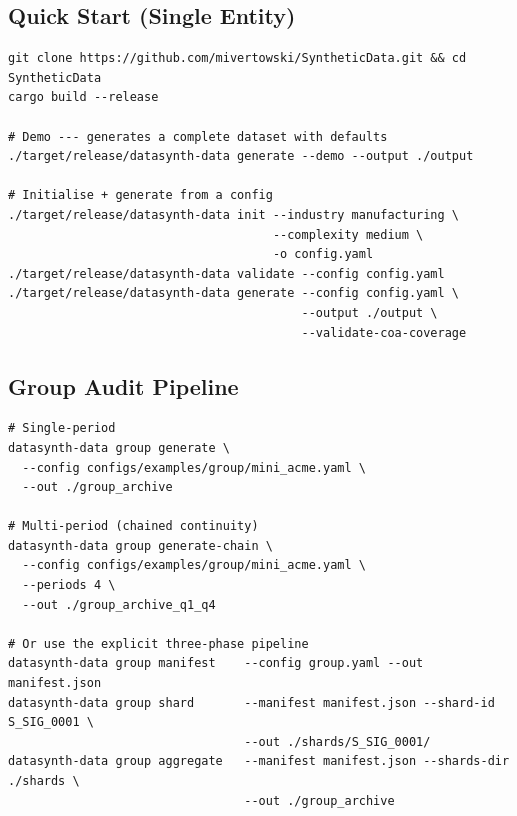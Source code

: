 \documentclass[11pt,a4paper]{article}
\begin{document}
\subsection{Quick Start (Single Entity)}

\begin{tcolorbox}[notebox={CLI}]
\small
\begin{verbatim}
git clone https://github.com/mivertowski/SyntheticData.git && cd SyntheticData
cargo build --release

# Demo --- generates a complete dataset with defaults
./target/release/datasynth-data generate --demo --output ./output

# Initialise + generate from a config
./target/release/datasynth-data init --industry manufacturing \
                                     --complexity medium \
                                     -o config.yaml
./target/release/datasynth-data validate --config config.yaml
./target/release/datasynth-data generate --config config.yaml \
                                         --output ./output \
                                         --validate-coa-coverage
\end{verbatim}
\end{tcolorbox}

\subsection{Group Audit Pipeline}

\begin{tcolorbox}[notebox={Multi-entity consolidation}]
\small
\begin{verbatim}
# Single-period
datasynth-data group generate \
  --config configs/examples/group/mini_acme.yaml \
  --out ./group_archive

# Multi-period (chained continuity)
datasynth-data group generate-chain \
  --config configs/examples/group/mini_acme.yaml \
  --periods 4 \
  --out ./group_archive_q1_q4

# Or use the explicit three-phase pipeline
datasynth-data group manifest    --config group.yaml --out manifest.json
datasynth-data group shard       --manifest manifest.json --shard-id S_SIG_0001 \
                                 --out ./shards/S_SIG_0001/
datasynth-data group aggregate   --manifest manifest.json --shards-dir ./shards \
                                 --out ./group_archive
\end{verbatim}
\end{tcolorbox}
\end{document}

